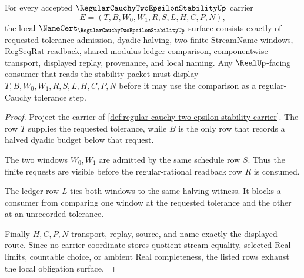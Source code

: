\begin{theorem}
\label{thm:regular-cauchy-two-epsilon-stability-obligation-surface}
For every accepted $\RegularCauchyTwoEpsilonStabilityUp$ carrier
$$
E=(T,B,W_0,W_1,R,S,L,H,C,P,N),
$$
the local $\NameCert_{\RegularCauchyTwoEpsilonStabilityUp}$ surface consists exactly of requested tolerance admission, dyadic halving, two finite StreamName windows, RegSeqRat readback, shared modulus-ledger comparison, componentwise transport, displayed replay, provenance, and local naming. Any $\RealUp$-facing consumer that reads the stability packet must display $T,B,W_0,W_1,R,S,L,H,C,P,N$ before it may use the comparison as a regular-Cauchy tolerance step.
\end{theorem}
\begin{proof}
Project the carrier of \autoref{def:regular-cauchy-two-epsilon-stability-carrier}. The row $T$ supplies the requested tolerance, while $B$ is the only row that records a halved dyadic budget below that request.

The two windows $W_0,W_1$ are admitted by the same schedule row $S$. Thus the finite requests are visible before the regular-rational readback row $R$ is consumed.

The ledger row $L$ ties both windows to the same halving witness. It blocks a consumer from comparing one window at the requested tolerance and the other at an unrecorded tolerance.

Finally $H,C,P,N$ transport, replay, source, and name exactly the displayed route. Since no carrier coordinate stores quotient stream equality, selected Real limits, countable choice, or ambient Real completeness, the listed rows exhaust the local obligation surface.
\end{proof}

